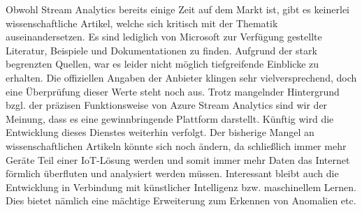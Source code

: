 Obwohl Stream Analytics bereits einige Zeit auf dem Markt ist, gibt es keinerlei wissenschaftliche Artikel, welche sich kritisch mit der Thematik auseinandersetzen. Es sind lediglich von Microsoft zur Verfügung gestellte Literatur, Beispiele und Dokumentationen zu finden. Aufgrund der stark begrenzten Quellen, war es leider nicht möglich tiefgreifende Einblicke zu erhalten. Die offiziellen Angaben der Anbieter klingen sehr vielversprechend, doch eine Überprüfung dieser Werte steht noch aus. Trotz mangelnder Hintergrund bzgl. der präzisen Funktionsweise von Azure Stream Analytics sind wir der Meinung, dass es eine gewinnbringende Plattform darstellt.
Künftig wird die Entwicklung dieses Dienstes weiterhin verfolgt. Der bisherige Mangel an wissenschaftlichen Artikeln könnte sich noch ändern, da schließlich immer mehr Geräte Teil einer IoT-Lösung werden und somit immer mehr Daten das Internet förmlich überfluten und analysiert werden müssen. Interessant bleibt auch die Entwicklung in Verbindung mit künstlicher Intelligenz bzw. maschinellem Lernen. Dies bietet nämlich eine mächtige Erweiterung zum Erkennen von Anomalien etc.\\

 

%

\ifCLASSOPTIONcaptionsoff
  \newpage
\fi